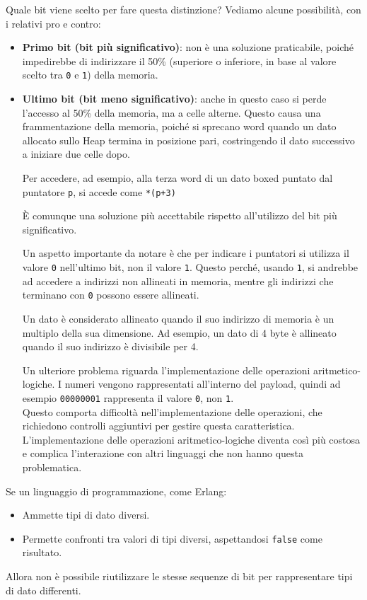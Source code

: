 \documentclass{article}
\begin{document}
\pagebreak

Quale bit viene scelto per fare questa distinzione? Vediamo alcune possibilità, con i relativi pro e contro:
\begin{itemize}
    \item \textbf{Primo bit (bit più significativo)}: non è una soluzione praticabile, poiché impedirebbe di indirizzare il 50\% (superiore o inferiore, in base al valore scelto tra \texttt{0} e \texttt{1}) della memoria.
    \item \textbf{Ultimo bit (bit meno significativo)}: anche in questo caso si perde l'accesso al 50\% della memoria, ma a celle alterne. Questo causa una frammentazione della memoria, poiché si sprecano word quando un dato allocato sullo Heap termina in posizione pari, costringendo il dato successivo a iniziare due celle dopo.
    
    Per accedere, ad esempio, alla terza word di un dato boxed puntato dal puntatore \texttt{p}, si accede come \texttt{*(p+3)}

    È comunque una soluzione più accettabile rispetto all'utilizzo del bit più significativo.

    Un aspetto importante da notare è che per indicare i puntatori si utilizza il valore \texttt{0} nell'ultimo bit, non il valore \texttt{1}. Questo perché, usando \texttt{1}, si andrebbe ad accedere a indirizzi non allineati in memoria, mentre gli indirizzi che terminano con \texttt{0} possono essere allineati.
    
    Un dato è considerato allineato quando il suo indirizzo di memoria è un multiplo della sua dimensione. Ad esempio, un dato di 4 byte è allineato quando il suo indirizzo è divisibile per 4.

    Un ulteriore problema riguarda l'implementazione delle operazioni aritmetico-logiche. I numeri vengono rappresentati all'interno del payload, quindi ad esempio \texttt{00000001} rappresenta il valore \texttt{0}, non \texttt{1}.\\
    Questo comporta difficoltà nell'implementazione delle operazioni, che richiedono controlli aggiuntivi per gestire questa caratteristica. L'implementazione delle operazioni aritmetico-logiche diventa così più costosa e complica l'interazione con altri linguaggi che non hanno questa problematica.\\
\end{itemize}

Se un linguaggio di programmazione, come Erlang:
\begin{itemize}
    \item Ammette tipi di dato diversi.
    \item Permette confronti tra valori di tipi diversi, aspettandosi \texttt{false} come risultato.
\end{itemize}
Allora non è possibile riutilizzare le stesse sequenze di bit per rappresentare tipi di dato differenti.
\end{document}
